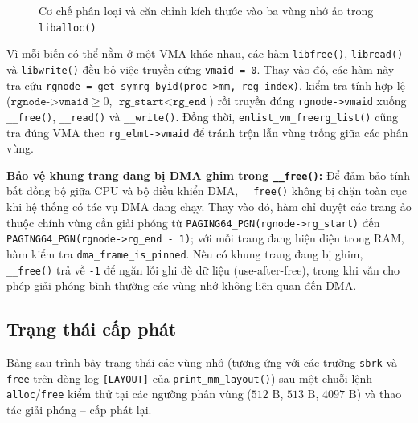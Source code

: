 \documentclass[12pt,a4paper]{article}
\begin{document}
\begin{figure}[H]
{%
    }
    \caption{Cơ chế phân loại và căn chỉnh kích thước vào ba vùng nhớ ảo trong \texttt{liballoc()}}
    \label{fig:vma_size_partition}
    \end{figure}
    
    
    Vì mỗi biến có thể nằm ở một VMA khác nhau, các hàm \texttt{libfree()}, \texttt{libread()} và \texttt{libwrite()} đều bỏ việc truyền cứng \texttt{vmaid = 0}. Thay vào đó, các hàm này tra cứu \texttt{rgnode = get\_symrg\_byid(proc->mm, reg\_index)}, kiểm tra tính hợp lệ ($\texttt{rgnode->vmaid} \ge 0$, $\texttt{rg\_start} < \texttt{rg\_end}$) rồi truyền đúng \texttt{rgnode->vmaid} xuống \texttt{\_\_free()}, \texttt{\_\_read()} và \texttt{\_\_write()}. Đồng thời, \texttt{enlist\_vm\_freerg\_list()} cũng tra đúng VMA theo \texttt{rg\_elmt->vmaid} để tránh trộn lẫn vùng trống giữa các phân vùng.
    
    \noindent\textbf{Bảo vệ khung trang đang bị DMA ghim trong \texttt{\_\_free()}:}
    Để đảm bảo tính bất đồng bộ giữa CPU và bộ điều khiển DMA, \texttt{\_\_free()} không bị chặn toàn cục khi hệ thống có tác vụ DMA đang chạy. Thay vào đó, hàm chỉ duyệt các trang ảo thuộc chính vùng cần giải phóng từ \texttt{PAGING64\_PGN(rgnode->rg\_start)} đến \texttt{PAGING64\_PGN(rgnode->rg\_end - 1)}; với mỗi trang đang hiện diện trong RAM, hàm kiểm tra \texttt{dma\_frame\_is\_pinned}. Nếu có khung trang đang bị ghim, \texttt{\_\_free()} trả về \texttt{-1} để ngăn lỗi ghi đè dữ liệu (use-after-free), trong khi vẫn cho phép giải phóng bình thường các vùng nhớ không liên quan đến DMA.
    
    \subsection{Trạng thái cấp phát}
    Bảng sau trình bày trạng thái các vùng nhớ (tương ứng với các trường \texttt{sbrk} và \texttt{free} trên dòng log \texttt{[LAYOUT]} của \texttt{print\_mm\_layout()}) sau một chuỗi lệnh \texttt{alloc}/\texttt{free} kiểm thử tại các ngưỡng phân vùng ($512\text{ B}$, $513\text{ B}$, $4097\text{ B}$) và thao tác giải phóng -- cấp phát lại.
    
\end{document}
